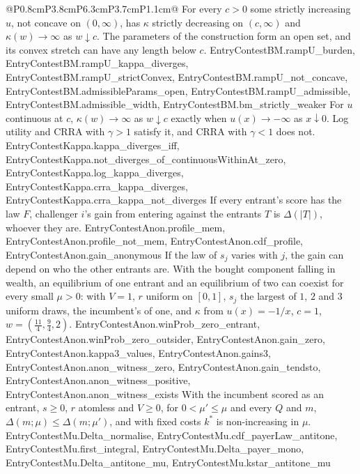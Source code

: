\begin{longtable}{@{}P{0.8cm}P{3.8cm}P{6.3cm}P{3.7cm}P{1.1cm}@{}}
  {For every $c>0$ some strictly increasing $u$, not concave on $(0,\infty)$, has
  $\kappa$ strictly decreasing on $(c,\infty)$ and $\kappa(w)\to\infty$ as
  $w\downarrow c$. The parameters of the construction form an open set, and its
  convex stretch can have any length below $c$.}
  {EntryContestBM.rampU_burden, EntryContestBM.rampU_kappa_diverges, EntryContestBM.rampU_strictConvex, EntryContestBM.rampU_not_concave, EntryContestBM.admissibleParams_open, EntryContestBM.rampU_admissible, EntryContestBM.admissible_width, EntryContestBM.bm_strictly_weaker}
  {For $u$ continuous at $c$, $\kappa(w)\to\infty$ as $w\downarrow c$ exactly when
  $u(x)\to-\infty$ as $x\downarrow0$. Log utility and CRRA with $\gamma>1$
  satisfy it, and CRRA with $\gamma<1$ does not.}
  {EntryContestKappa.kappa_diverges_iff, EntryContestKappa.not_diverges_of_continuousWithinAt_zero, EntryContestKappa.log_kappa_diverges, EntryContestKappa.crra_kappa_diverges, EntryContestKappa.crra_kappa_not_diverges}
  {If every entrant's score has the law $F$, challenger $i$'s gain from entering
  against the entrants $T$ is $\Delta(|T|)$, whoever they are.}
  {EntryContestAnon.profile_mem, EntryContestAnon.profile_not_mem, EntryContestAnon.cdf_profile, EntryContestAnon.gain_anonymous}
  {If the law of $s_j$ varies with $j$, the gain can depend on who the other
  entrants are. With the bought component falling in wealth, an equilibrium of one entrant
  and an equilibrium of two can coexist for every small $\mu>0$: with $V=1$,
  $r$ uniform on $[0,1]$, $s_j$ the largest of $1$, $2$ and $3$ uniform draws,
  the incumbent's of one, and $\kappa$ from $u(x)=-1/x$, $c=1$,
  $w=(\frac{11}4,\frac94,2)$.}
  {EntryContestAnon.winProb_zero_entrant, EntryContestAnon.winProb_zero_outsider, EntryContestAnon.gain_zero, EntryContestAnon.kappa3_values, EntryContestAnon.gains3, EntryContestAnon.anon_witness_zero, EntryContestAnon.gain_tendsto, EntryContestAnon.anon_witness_positive, EntryContestAnon.anon_witness_exists}
  {With the incumbent scored as an entrant, $s\ge0$, $r$ atomless and $V\ge0$, for
  $0<\mu'\le\mu$ and every $Q$ and $m$, $\Delta(m;\mu)\le\Delta(m;\mu')$, and
  with fixed costs $k^*$ is non-increasing in $\mu$.}
  {EntryContestMu.Delta_normalise, EntryContestMu.cdf_payerLaw_antitone, EntryContestMu.first_integral, EntryContestMu.Delta_payer_mono, EntryContestMu.Delta_antitone_mu, EntryContestMu.kstar_antitone_mu}

\end{longtable}
